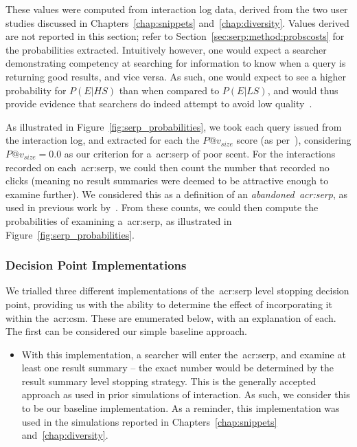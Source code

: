 These values were computed from interaction log data, derived from the two user studies discussed in Chapters~\ref{chap:snippets} and~\ref{chap:diversity}. Values derived are not reported in this section; refer to Section~\ref{sec:serp:method:probscosts} for the probabilities extracted. Intuitively however, one would expect a searcher demonstrating competency at searching for information to know when a query is returning good results, and vice versa. As such, one would expect to see a higher probability for $P(E|HS)$ than when compared to $P(E|LS)$, and would thus provide evidence that searchers do indeed attempt to avoid low quality~.

As illustrated in Figure~\ref{fig:serp_probabilities}, we took each query issued from the interaction log, and extracted for each the $P@v_{size}$ score (as per~\cite{wu2014information_scent}), considering $P@v_{size}=0.0$ as our criterion for a~\gls{acr:serp} of poor scent. For the interactions recorded on each~\gls{acr:serp}, we could then count the number that recorded no clicks (meaning no result summaries were deemed to be attractive enough to examine further). We considered this as a definition of an \emph{abandoned~\gls{acr:serp}}, as used in previous work by~\cite{hassan2013serp_abandonment}. From these counts, we could then compute the probabilities of examining a~\gls{acr:serp}, as illustrated in Figure~\ref{fig:serp_probabilities}.

\subsubsection{Decision Point Implementations}\label{sec:serp:method:serp_dp:implementations}
We trialled three different implementations of the~\gls{acr:serp} level stopping decision point, providing us with the ability to determine the effect of incorporating it within the~\gls{acr:csm}. These are enumerated below, with an explanation of each. The first can be considered our simple baseline approach.

\begin{itemize}
    \item{ With this implementation, a searcher will  enter the~\gls{acr:serp}, and examine at least one result summary -- the exact number would be determined by the result summary level stopping strategy. This is the generally accepted approach as used in prior simulations of interaction. As such, we consider this to be our baseline implementation. As a reminder, this implementation was used in the simulations reported in Chapters~\ref{chap:snippets} and~\ref{chap:diversity}.}
\end{itemize}

